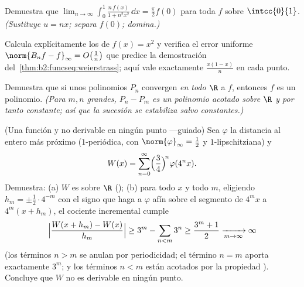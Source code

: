 \begin{exercise}[$\star\star$]\label{exo:b2:funcseq:6}
Demuestra que $\displaystyle\lim_{n\to\infty} \int_0^1
\frac{n\,f(x)}{1 + n^2x^2}\,\dd x = \frac{\pi}{2} f(0)$ para toda $f$
 sobre $\intcc{0}{1}$. \emph{(Sustituye $u = nx$; separa
$f(0)$; domina.)}
\end{exercise}

\begin{exercise}[$\star\star$]\label{exo:b2:funcseq:7}
Calcula explícitamente los  de $f(x) = x^2$ y
verifica el error uniforme $\norm{B_n f - f}_\infty =
O\bigl(\frac1n\bigr)$ que predice la demostración del~\cref{thm:b2:funcseq:weierstrass}; aquí vale exactamente $\frac{x(1 -
x)}{n}$ en cada punto.
\end{exercise}

\begin{exercise}[$\star\star$]\label{exo:b2:funcseq:8}
Demuestra que si unos polinomios $P_n$ convergen 
\emph{en todo $\R$} a $f$, entonces $f$ es un polinomio. \emph{(Para
$m, n$ grandes, $P_n - P_m$ es un polinomio acotado sobre $\R$ y por
tanto constante; así que la sucesión se estabiliza salvo
constantes.)}
\end{exercise}

\begin{exercise}[$\star\star\star$]\label{exo:b2:funcseq:9}
(Una función  y no derivable en ningún punto ---guiado) Sea
$\varphi$ la distancia al entero más próximo ($1$-periódica, con
$\norm{\varphi}_\infty = \frac12$ y $1$-lipschitziana) y
\[
W(x) = \sum_{n=0}^{\infty} \Bigl(\frac{3}{4}\Bigr)^{\!n}
\varphi(4^n x) .
\]
Demuestra: (a) $W$ es  sobre $\R$ ();
(b) para todo $x$ y todo $m$, eligiendo $h_m = \pm\frac12\cdot
4^{-m}$ con el signo que haga a $\varphi$ afín sobre el segmento de
$4^m x$ a $4^m(x + h_m)$, el cociente incremental cumple
\[
\Bigl|\frac{W(x + h_m) - W(x)}{h_m}\Bigr| \geq 3^m -
\sum_{n<m} 3^n \geq \frac{3^m + 1}{2} \xrightarrow[m\to\infty]{}
\infty
\]
(los términos $n > m$ se anulan por periodicidad; el término $n = m$
aporta exactamente $3^m$; y los términos $n < m$ están acotados por
la propiedad ). Concluye que $W$ no es derivable en
ningún punto.
\end{exercise}

